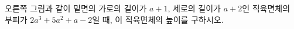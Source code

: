 \noindent\begin{minipage}[t]{0.58\linewidth}\vspace{0pt}\raggedright 오른쪽 그림과 같이 밑면의 가로의 길이가 $a+1$, 세로의 길이가 $a+2$인 직육면체의 부피가 $2a^3+5a^2+a-2$일 때, 이 직육면체의 높이를 구하시오.\end{minipage}\hfill\begin{minipage}[t]{0.4\linewidth}\vspace{0pt}\centering \resizebox{\ifdim\width>\linewidth\linewidth\else\width\fi}{!}{}\end{minipage}\par
